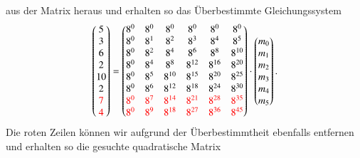 aus der Matrix heraus und erhalten so das Überbestimmte Gleichungssystem
\[
\begin{pmatrix}
	5 \\ 3 \\ 6 \\ 2 \\ 10 \\ 2 \\ \textcolor{red}{7} \\ \textcolor{red}{4} \\
\end{pmatrix}
=
\begin{pmatrix}
	8^0&    8^0&    8^0&    8^0&    8^0&    8^0\\
	8^0&	8^1&	8^2&	8^3&	8^4&	8^5\\
	8^0&	8^2&	8^4&	8^6&	8^8& 8^{10}\\
	8^0&	8^4&	8^8& 8^{12}& 8^{16}& 8^{20}\\
	8^0&	8^5& 8^{10}& 8^{15}& 8^{20}& 8^{25}\\
	8^0&	8^6& 8^{12}& 8^{18}& 8^{24}& 8^{30}\\
	\textcolor{red}{8^0}&	\textcolor{red}{8^7}& \textcolor{red}{8^{14}}& \textcolor{red}{8^{21}}& \textcolor{red}{8^{28}}& \textcolor{red}{8^{35}}\\
	\textcolor{red}{8^0}&	\textcolor{red}{8^9}& \textcolor{red}{8^{18}}& \textcolor{red}{8^{27}}& \textcolor{red}{8^{36}}& \textcolor{red}{8^{45}}\\
\end{pmatrix}
\cdot
\begin{pmatrix}
	m_0 \\ m_1 \\ m_2 \\ m_3 \\ m_4 \\ m_5 \\
\end{pmatrix}
.
\]
Die roten Zeilen können wir aufgrund der Überbestimmtheit ebenfalls entfernen und erhalten so die gesuchte quadratische Matrix
